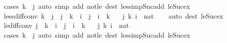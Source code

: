 \begin{isabellebody}
\isatagproof
{}\isamarkupfalse%
\ {\isacharparenleft}{\kern0pt}cases\ {\isachardoublequoteopen}k\ {\isasymle}\ j{\isachardoublequoteclose}{\isacharparenright}{\kern0pt}\ {\isacharparenleft}{\kern0pt}auto\ simp\ add{\isacharcolon}{\kern0pt}\ not{\isacharunderscore}{\kern0pt}le\ dest{\isacharcolon}{\kern0pt}\ less{\isacharunderscore}{\kern0pt}imp{\isacharunderscore}{\kern0pt}Suc{\isacharunderscore}{\kern0pt}add\ le{\isacharunderscore}{\kern0pt}Suc{\isacharunderscore}{\kern0pt}ex{\isacharparenright}{\kern0pt}%
\endisatagproof
{\isafoldproof}%
%
\isadelimproof
\isanewline
%
\endisadelimproof
\isanewline
{}\isamarkupfalse%
\ less{\isacharunderscore}{\kern0pt}diff{\isacharunderscore}{\kern0pt}conv{}{\isacharcolon}{\kern0pt}\ {\isachardoublequoteopen}k\ {\isasymle}\ j\ {\isasymLongrightarrow}\ j\ {\isacharminus}{\kern0pt}\ k\ {\isacharless}{\kern0pt}\ i\ {\isasymlongleftrightarrow}\ j\ {\isacharless}{\kern0pt}\ i\ {\isacharplus}{\kern0pt}\ k{\isachardoublequoteclose}\isanewline
\ \ \ j\ k\ i\ {\isacharcolon}{\kern0pt}{\isacharcolon}{\kern0pt}\ nat\isanewline
%
\isadelimproof
\ \ %
\endisadelimproof
%
\isatagproof
{}\isamarkupfalse%
\ {\isacharparenleft}{\kern0pt}auto\ dest{\isacharcolon}{\kern0pt}\ le{\isacharunderscore}{\kern0pt}Suc{\isacharunderscore}{\kern0pt}ex{\isacharparenright}{\kern0pt}%
\endisatagproof
{\isafoldproof}%
%
\isadelimproof
\isanewline
%
\endisadelimproof
\isanewline
{}\isamarkupfalse%
\ le{\isacharunderscore}{\kern0pt}diff{\isacharunderscore}{\kern0pt}conv{\isacharcolon}{\kern0pt}\ {\isachardoublequoteopen}j\ {\isacharminus}{\kern0pt}\ k\ {\isasymle}\ i\ {\isasymlongleftrightarrow}\ j\ {\isasymle}\ i\ {\isacharplus}{\kern0pt}\ k{\isachardoublequoteclose}\isanewline
\ \ \ j\ k\ i\ {\isacharcolon}{\kern0pt}{\isacharcolon}{\kern0pt}\ nat\isanewline
%
\isadelimproof
\ \ %
\endisadelimproof
%
\isatagproof
{}\isamarkupfalse%
\ {\isacharparenleft}{\kern0pt}cases\ {\isachardoublequoteopen}k\ {\isasymle}\ j{\isachardoublequoteclose}{\isacharparenright}{\kern0pt}\ {\isacharparenleft}{\kern0pt}auto\ simp\ add{\isacharcolon}{\kern0pt}\ not{\isacharunderscore}{\kern0pt}le\ dest{\isacharbang}{\kern0pt}{\isacharcolon}{\kern0pt}\ less{\isacharunderscore}{\kern0pt}imp{\isacharunderscore}{\kern0pt}Suc{\isacharunderscore}{\kern0pt}add\ le{\isacharunderscore}{\kern0pt}Suc{\isacharunderscore}{\kern0pt}ex{\isacharparenright}{\kern0pt}%
\endisatagproof
{\isafoldproof}%
%
\isadelimproof
\isanewline
%
\endisadelimproof
\isanewline
{}\isamarkupfalse%

\end{isabellebody}
